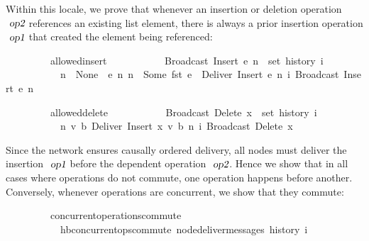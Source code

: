 Within this locale, we prove that whenever an insertion or deletion operation $\isa{op2}$ references an existing list element, there is always a prior insertion operation $\isa{op1}$ that created the element being referenced:
\vspace{0.35em}
\begin{isabellebody}
\ \ \ \ \ \ \ \ \ allowed{\isacharunderscore}insert{\isacharcolon}\isanewline
\ \ \ \ \ \ \ \ \ \ \ {\isachardoublequoteopen}Broadcast\ {\isacharparenleft}Insert\ e\ n{\isacharparenright}\ {\isasymin}\ set\ {\isacharparenleft}history\ i{\isacharparenright}{\isachardoublequoteclose}\isanewline
\ \ \ \ \ \ \ \ \ \ \ {\isachardoublequoteopen}n\ {\isacharequal}\ None\ {\isasymor}\ {\isacharparenleft}{\isasymexists}e{\isacharprime}\ n{\isacharprime}{\isachardot}\ n\ {\isacharequal}\ Some\ {\isacharparenleft}fst\ e{\isacharprime}{\isacharparenright}\ {\isasymand}\ Deliver\ {\isacharparenleft}Insert\ e{\isacharprime}\ n{\isacharprime}{\isacharparenright}\ {\isasymsqsubset}\isactrlsup i\ Broadcast\ {\isacharparenleft}Insert\ e\ n{\isacharparenright}{\isacharparenright}{\isachardoublequoteclose}
\end{isabellebody}
\vspace{0.35em}
\begin{isabellebody}
\ \ \ \ \ \ \ \ \ allowed{\isacharunderscore}delete{\isacharcolon}\isanewline
\ \ \ \ \ \ \ \ \ \ \ {\isachardoublequoteopen}Broadcast\ {\isacharparenleft}Delete\ x{\isacharparenright}\ {\isasymin}\ set\ {\isacharparenleft}history\ i{\isacharparenright}{\isachardoublequoteclose}\isanewline
\ \ \ \ \ \ \ \ \ \ \ {\isachardoublequoteopen}{\isasymexists}n{\isacharprime}\ v\ b{\isachardot}\ Deliver\ {\isacharparenleft}Insert\ {\isacharparenleft}x{\isacharcomma}\ v{\isacharcomma}\ b{\isacharparenright}\ n{\isacharprime}{\isacharparenright}\ {\isasymsqsubset}\isactrlsup i\ Broadcast\ {\isacharparenleft}Delete\ x{\isacharparenright}{\isachardoublequoteclose}
\end{isabellebody}
\vspace{0.35em}
Since the network ensures causally ordered delivery, all nodes must deliver the insertion $\isa{op1}$ before the dependent operation $\isa{op2}$.
Hence we show that in all cases where operations do not commute, one operation happens before another.
Conversely, whenever operations are concurrent, we show that they commute:
\vspace{0.35em}
\begin{isabellebody}
\ \ \ \ \ \ \ \ \ concurrent{\isacharunderscore}operations{\isacharunderscore}commute{\isacharcolon}\isanewline
\ \ \ \ \ \ \ \ \ \ \ {\isachardoublequoteopen}hb{\isachardot}concurrent{\isacharunderscore}ops{\isacharunderscore}commute\ {\isacharparenleft}node{\isacharunderscore}deliver{\isacharunderscore}messages\ {\isacharparenleft}history\ i{\isacharparenright}{\isacharparenright}{\isachardoublequoteclose}
\end{isabellebody}
